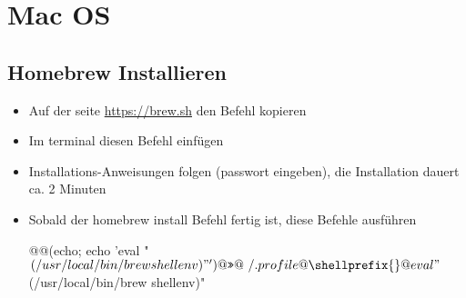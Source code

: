 \section*{Mac OS}

\subsection*{Homebrew Installieren}
\begin{itemize}
    \item Auf der seite \url{https://brew.sh} den Befehl kopieren
    \item Im terminal diesen Befehl einfügen
    \item Installations-Anweisungen folgen (passwort eingeben), die Installation dauert ca. 2 Minuten
    \item Sobald der homebrew install Befehl fertig ist, diese Befehle ausführen
    \begin{commandshell}
@\shellprefix{}@(echo; echo 'eval "$(/usr/local/bin/brew shellenv)"') @\texttt{>>}@ ~/.profile
@\shellprefix{}@eval "$(/usr/local/bin/brew shellenv)"
    \end{commandshell}
\end{itemize}

